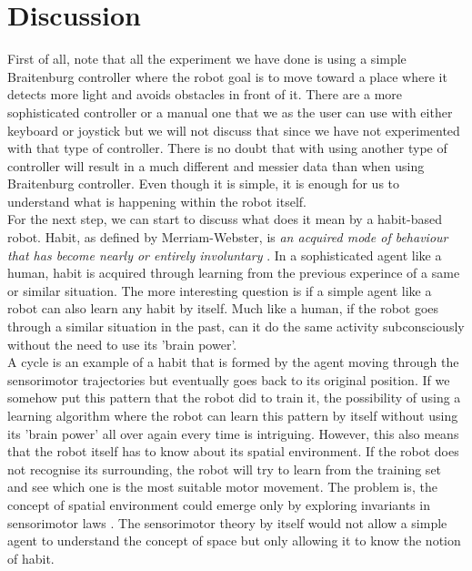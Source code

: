 \documentclass[a4paper]{article}
\begin{document}
\section{Discussion}
First of all, note that all the experiment we have done is using a simple Braitenburg controller where the robot goal is to move toward a place where it detects more light and avoids obstacles in front of it. There are a more sophisticated controller or a manual one that we as the user can use with either keyboard or joystick but we will not discuss that since we have not experimented with that type of controller. There is no doubt that with using another type of controller will result in a much different and messier data than when using Braitenburg controller. Even though it is simple, it is enough for us to understand what is happening within the robot itself.
\\\newline
For the next step, we can start to discuss what does it mean by a habit-based robot. Habit, as defined by Merriam-Webster, is \emph{an acquired mode of behaviour that has become nearly or entirely involuntary} \cite{habit-definition}. In a sophisticated agent like a human, habit is acquired through learning from the previous experince of a same or similar situation. The more interesting question is if a simple agent like a robot can also learn any habit by itself. Much like a human, if the robot goes through a similar situation in the past, can it do the same activity subconsciously without the need to use its 'brain power'.\cite{matthew}
\\\newline
A cycle is an example of a habit that is formed by the agent moving through the sensorimotor trajectories but eventually goes back to its original position. If we somehow put this pattern that the robot did to train it, the possibility of using a learning algorithm where the robot can learn this pattern by itself without using its 'brain power' all over again every time is intriguing. However, this also means that the robot itself has to know about its spatial environment. If the robot does not recognise its surrounding, the robot will try to learn from the training set and see which one is the most suitable motor movement. The problem is, the concept of spatial environment could emerge only by exploring invariants in sensorimotor laws \cite{sensorimotor-theory}. The sensorimotor theory by itself would not allow a simple agent to understand the concept of space but only allowing it to know the notion of habit.
\end{document}
